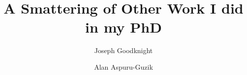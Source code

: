 



\title{A Smattering of Other Work I did in my PhD}
\author{Joseph Goodknight}
\author{Alan Aspuru-Guzik}


\maketitle








